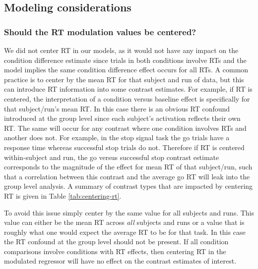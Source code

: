 \documentclass[titlepage,12pt] {article}
\begin{document}
\subsection*{Modeling considerations}

\subsubsection*{Should the RT modulation values be centered?}
We did not center RT in our models, as it would not have any impact on the condition difference estimate since trials in both conditions involve RTs and the model implies the same condition difference effect occurs for all RTs.  A common practice is to center by the mean RT for that subject and run of data, but this can introduce RT information into some contrast estimates.  For example, if RT is centered, the interpretation of a condition versus baseline effect is specifically for that subject/run's mean RT.  In this case there is an obvious RT confound introduced at the group level since each subject's activation reflects their own RT.  The same will occur for any contrast where one condition involves RTs and another does not.  For example, in the stop signal task the go trials have a response time whereas successful stop trials do not.  Therefore if RT is centered within-subject and run, the go versus successful stop contrast estimate corresponds to the magnitude of the effect for mean RT of that subject/run, such that a correlation between this contrast and the average go RT will leak into the group level analysis.  A summary of contrast types that are impacted by centering RT is given in Table \ref{tab:centering-rt}.

To avoid this issue simply center by the same value for all subjects and runs.  This value can either be the mean RT across \emph{all} subjects and runs or a value that is roughly what one would expect the average RT to be for that task.  In this case the RT confound at the group level should not be present.  If all condition comparisons involve conditions with RT effects, then centering RT in the modulated regressor will have no effect on the contrast estimates of interest.
\end{document}
